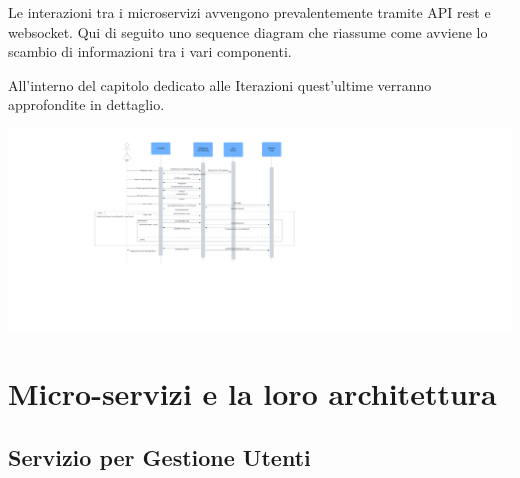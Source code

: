 Le interazioni tra i microservizi avvengono prevalentemente tramite API rest e websocket. Qui di seguito uno sequence diagram che riassume come avviene lo scambio di informazioni tra i vari componenti.

All'interno del capitolo dedicato alle Iterazioni quest'ultime verranno approfondite in dettaglio.

\includegraphics[width=28cm]{report/img/Maraffa_Diagram.png}\\[5.5cm]

\section{Micro-servizi e la loro architettura}

\newpage



\subsection{Servizio per Gestione Utenti}

